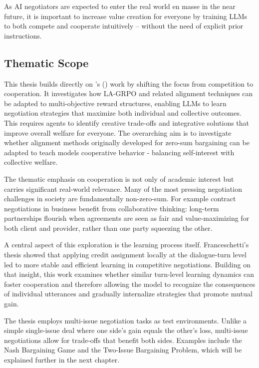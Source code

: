 \documentclass[12pt,a4paper]{article}
\begin{document}
\par
As AI negotiators are expected to enter the real world en masse in the near future, it is important to increase value creation for everyone by training LLMs to both compete and cooperate intuitively -- without the need of explicit prior instructions.


\subsection{Thematic Scope}

This thesis builds directly on \citeauthor{franceschetti2025advantage}'s (\citeyear{franceschetti2025advantage}) work by shifting the focus from competition to cooperation. It investigates how LA-GRPO and related alignment techniques can be adapted to multi-objective reward structures, enabling LLMs to learn negotiation strategies that maximize both individual and collective outcomes. This requires agents to identify creative trade-offs and integrative solutions that improve overall welfare for everyone. The overarching aim is to investigate whether alignment methods originally developed for zero-sum bargaining can be adapted to teach models cooperative behavior - balancing self-interest with collective welfare.
\par
The thematic emphasis on cooperation is not only of academic interest but carries significant real-world relevance. Many of the most pressing negotiation challenges in society are fundamentally non-zero-sum. For example contract negotiations in business benefit from collaborative thinking: long-term partnerships flourish when agreements are seen as fair and value-maximizing for both client and provider, rather than one party squeezing the other.
\par
A central aspect of this exploration is the learning process itself. Franceschetti's thesis showed that applying credit assignment locally at the dialogue-turn level led to more stable and efficient learning in competitive negotiations. Building on that insight, this work examines whether similar turn-level learning dynamics can foster cooperation and therefore allowing the model to recognize the consequences of individual utterances and gradually internalize strategies that promote mutual gain.
\par
The thesis employs multi-issue negotiation tasks as test environments. Unlike a simple single-issue deal where one side's gain equals the other's loss, multi-issue negotiations allow for trade-offs that benefit both sides. Examples include the Nash Bargaining Game and the Two-Issue Bargaining Problem, which will be explained further in the next chapter.
\end{document}
